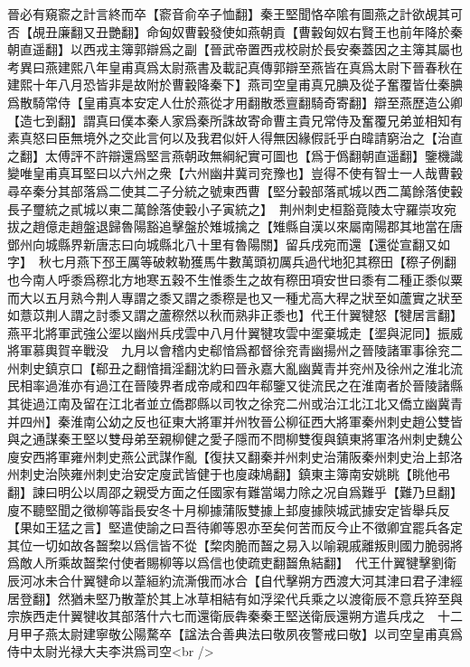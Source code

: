 晉必有窺窬之計言終而卒【窬音俞卒子恤翻】秦王堅聞恪卒隂有圖燕之計欲覘其可否【覘丑廉翻又丑艷翻】命匈奴曹轂發使如燕朝貢【曹轂匈奴右賢王也前年降於秦朝直遥翻】以西戎主簿郭辯爲之副【晉武帝置西戎校尉於長安秦蓋因之主簿其屬也　考異曰燕建熙八年皇甫真爲太尉燕書及載記真傳郭辯至燕皆在真爲太尉下晉春秋在建熙十年八月恐皆非是故附於曹轂降秦下】燕司空皇甫真兄腆及從子奮覆皆仕秦腆爲散騎常侍【皇甫真本安定人仕於燕從才用翻散悉亶翻騎奇寄翻】辯至燕歷造公卿【造七到翻】謂真曰僕本秦人家爲秦所誅故寄命曹主貴兄常侍及奮覆兄弟並相知有素真怒曰臣無境外之交此言何以及我君似奸人得無因緣假託乎白暐請窮治之【治直之翻】太傅評不許辯還爲堅言燕朝政無綱紀實可圖也【爲于僞翻朝直遥翻】鑒機識變唯皇甫真耳堅曰以六州之衆【六州幽井冀司兖豫也】豈得不使有智士一人哉曹轂尋卒秦分其部落爲二使其二子分統之號東西曹【堅分轂部落貳城以西二萬餘落使轂長子璽統之貳城以東二萬餘落使轂小子寅統之】　荆州刺史桓豁竟陵太守羅崇攻宛拔之趙億走趙盤退歸魯陽豁追擊盤於雉城擒之【雉縣自漢以來屬南陽郡其地當在唐鄧州向城縣界新唐志曰向城縣北八十里有魯陽關】留兵戌宛而還【還從宣翻又如字】　秋七月燕下邳王厲等破敕勒獲馬牛數萬頭初厲兵過代地犯其穄田【穄子例翻也今南人呼黍爲穄北方地寒五穀不生惟黍生之故有穄田項安世曰黍有二種正黍似粟而大以五月熟今荆人專謂之黍又謂之黍穄是也又一種尤高大稈之狀至如蘆實之狀至如薏苡荆人謂之討黍又謂之蘆穄然以秋而熟非正黍也】代王什翼犍怒【犍居言翻】燕平北將軍武強公埿以幽州兵戌雲中八月什翼犍攻雲中埿棄城走【埿與泥同】振威將軍慕輿賀辛戰没　九月以會稽内史郗愔爲都督徐兖青幽揚州之晉陵諸軍事徐兖二州刺史鎮京口【郗丑之翻愔揖淫翻沈約曰晉永嘉大亂幽冀青并兖州及徐州之淮北流民相率過淮亦有過江在晉陵界者成帝咸和四年郗鑒又徙流民之在淮南者於晉陵諸縣其徙過江南及留在江北者並立僑郡縣以司牧之徐兖二州或治江北江北又僑立幽冀青并四州】秦淮南公幼之反也征東大將軍并州牧晉公柳征西大將軍秦州刺史趙公雙皆與之通謀秦王堅以雙母弟至親柳健之愛子隱而不問柳雙復與鎮東將軍洛州刺史魏公廋安西將軍雍州刺史燕公武謀作亂【復扶又翻秦并州刺史治蒲阪秦州刺史治上邽洛州刺史治陝雍州刺史治安定廋武皆健于也廋疎鳩翻】鎮東主簿南安姚眺【眺他弔翻】諫曰明公以周邵之親受方面之任國家有難當竭力除之况自爲難乎【難乃旦翻】廋不聽堅聞之徵柳等詣長安冬十月柳據蒲阪雙據上邽廋據陝城武據安定皆舉兵反【果如王猛之言】堅遣使諭之曰吾待卿等恩亦至矣何苦而反今止不徵卿宜罷兵各定其位一切如故各齧棃以爲信皆不從【棃肉脆而齧之易入以喻親戚離叛則國力脆弱將爲敵人所乘故齧棃付使者賜柳等以爲信也使疏吏翻齧魚結翻】　代王什翼犍擊劉衛辰河冰未合什翼犍命以葦絙約流澌俄而冰合【自代擊朔方西渡大河其津曰君子津經居登翻】然猶未堅乃散葦於其上冰草相結有如浮梁代兵乘之以渡衛辰不意兵猝至與宗族西走什翼犍收其部落什六七而還衛辰犇秦秦王堅送衛辰還朔方遣兵戌之　十二月甲子燕太尉建寧敬公陽騖卒【諡法合善典法曰敬夙夜警戒曰敬】以司空皇甫真爲侍中太尉光禄大夫李洪爲司空<br />
